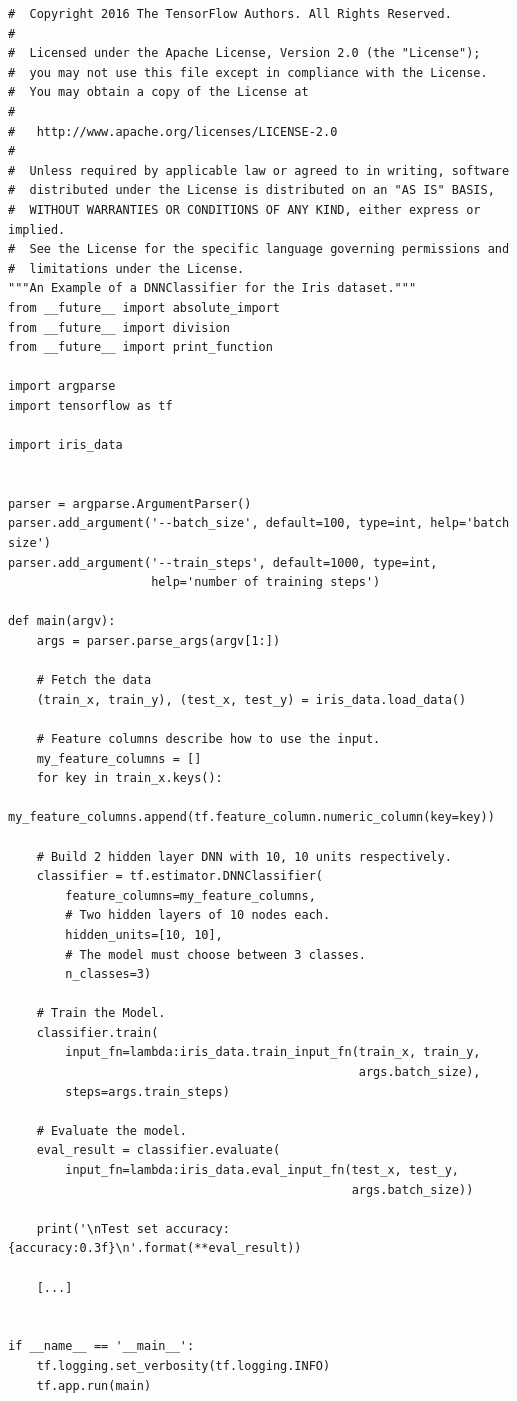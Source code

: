 \begin{verbatim}
#  Copyright 2016 The TensorFlow Authors. All Rights Reserved.
#
#  Licensed under the Apache License, Version 2.0 (the "License");
#  you may not use this file except in compliance with the License.
#  You may obtain a copy of the License at
#
#   http://www.apache.org/licenses/LICENSE-2.0
#
#  Unless required by applicable law or agreed to in writing, software
#  distributed under the License is distributed on an "AS IS" BASIS,
#  WITHOUT WARRANTIES OR CONDITIONS OF ANY KIND, either express or implied.
#  See the License for the specific language governing permissions and
#  limitations under the License.
"""An Example of a DNNClassifier for the Iris dataset."""
from __future__ import absolute_import
from __future__ import division
from __future__ import print_function

import argparse
import tensorflow as tf

import iris_data


parser = argparse.ArgumentParser()
parser.add_argument('--batch_size', default=100, type=int, help='batch size')
parser.add_argument('--train_steps', default=1000, type=int,
                    help='number of training steps')

def main(argv):
    args = parser.parse_args(argv[1:])

    # Fetch the data
    (train_x, train_y), (test_x, test_y) = iris_data.load_data()

    # Feature columns describe how to use the input.
    my_feature_columns = []
    for key in train_x.keys():
        my_feature_columns.append(tf.feature_column.numeric_column(key=key))

    # Build 2 hidden layer DNN with 10, 10 units respectively.
    classifier = tf.estimator.DNNClassifier(
        feature_columns=my_feature_columns,
        # Two hidden layers of 10 nodes each.
        hidden_units=[10, 10],
        # The model must choose between 3 classes.
        n_classes=3)

    # Train the Model.
    classifier.train(
        input_fn=lambda:iris_data.train_input_fn(train_x, train_y,
                                                 args.batch_size),
        steps=args.train_steps)

    # Evaluate the model.
    eval_result = classifier.evaluate(
        input_fn=lambda:iris_data.eval_input_fn(test_x, test_y,
                                                args.batch_size))

    print('\nTest set accuracy: {accuracy:0.3f}\n'.format(**eval_result))

    [...]


if __name__ == '__main__':
    tf.logging.set_verbosity(tf.logging.INFO)
    tf.app.run(main)
\end{verbatim}

